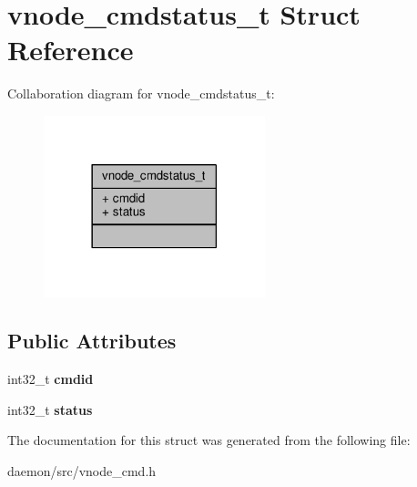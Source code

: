 \hypertarget{structvnode__cmdstatus__t}{\section{vnode\+\_\+cmdstatus\+\_\+t Struct Reference}
\label{structvnode__cmdstatus__t}
}


Collaboration diagram for vnode\+\_\+cmdstatus\+\_\+t\+:
\nopagebreak
\begin{figure}[H]
\begin{center}
\leavevmode
\includegraphics[width=182pt]{structvnode__cmdstatus__t__coll__graph}
\end{center}
\end{figure}
\subsection*{Public Attributes}
\begin{DoxyCompactItemize}
\item 
\hypertarget{structvnode__cmdstatus__t_a819b859acea7e110c35059c5a1c5c458}{int32\+\_\+t {\bfseries cmdid}}\label{structvnode__cmdstatus__t_a819b859acea7e110c35059c5a1c5c458}

\item 
\hypertarget{structvnode__cmdstatus__t_a59ffd1f87aa2b6d53d4c646b1ee608ca}{int32\+\_\+t {\bfseries status}}\label{structvnode__cmdstatus__t_a59ffd1f87aa2b6d53d4c646b1ee608ca}

\end{DoxyCompactItemize}


The documentation for this struct was generated from the following file\+:\begin{DoxyCompactItemize}
\item 
daemon/src/vnode\+\_\+cmd.\+h\end{DoxyCompactItemize}
